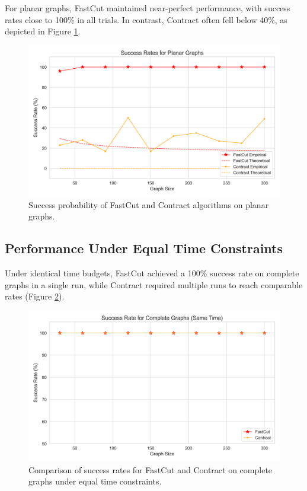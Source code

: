 \documentclass{article}
\theoremstyle{plain} %
\begin{document}
For planar graphs, FastCut maintained near-perfect performance, with success rates close to 100\% in all trials. In contrast, Contract often fell below 40\%, as depicted in Figure \ref{fig:planar-success-bounds}.

\begin{figure}[H]
    \centering
    \includegraphics[width=0.8\linewidth]{assets2//graphics/success_bounds_300_planar_success_plot.png}
    \caption{Success probability of FastCut and Contract algorithms on planar graphs.}
    \label{fig:planar-success-bounds}
\end{figure}

\subsection{Performance Under Equal Time Constraints}
Under identical time budgets, FastCut achieved a 100\% success rate on complete graphs in a single run, while Contract required multiple runs to reach comparable rates (Figure \ref{fig:complete-same-time}).

\begin{figure}[H]
    \centering
    \includegraphics[width=0.8\linewidth]{assets2//graphics/same_time_300_complete_same_time_plot.png}
    \caption{Comparison of success rates for FastCut and Contract on complete graphs under equal time constraints.}
    \label{fig:complete-same-time}
\end{figure}
\end{document}
